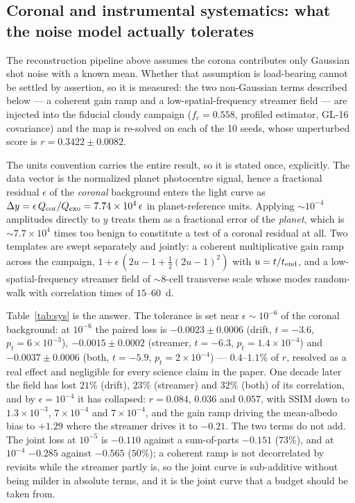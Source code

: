 \documentclass[twocolumn,10pt]{article}
\begin{document}
\subsection{Coronal and instrumental systematics: what the noise model
actually tolerates}
\label{sec:sys}
The reconstruction pipeline above assumes the corona contributes only Gaussian
shot noise with a known mean. Whether that assumption is
load-bearing cannot be settled by assertion, so it is measured: the two
non-Gaussian terms described below --- a coherent gain ramp and a
low-spatial-frequency streamer field --- are injected into the fiducial cloudy
campaign ($f_c=0.558$, profiled estimator, GL-16 covariance) and the map is
re-solved on each of the 10 seeds, whose unperturbed score is
$r=0.3422\pm0.0082$.

The units convention carries the entire result, so it is stated once, explicitly.
The data vector is the normalized planet photocentre signal, hence a fractional
residual $\epsilon$ of the \emph{coronal} background enters the light curve as
$\Delta y = \epsilon\,Q_{\rm cor}/Q_{\rm exo} = 7.74\times10^{4}\,\epsilon$ in
planet-reference units. Applying $\sim10^{-4}$ amplitudes directly to $y$ treats them as
a fractional error of the \emph{planet}, which is
$\sim7.7\times10^{4}$ times too benign to constitute a test of a coronal
residual at all. Two templates are swept separately and jointly: a coherent
multiplicative gain ramp across the campaign,
$1+\epsilon\,(2u-1+\tfrac{1}{2}(2u-1)^{2})$ with $u=t/t_{\rm end}$, and a
low-spatial-frequency streamer field of $\sim$8-cell transverse scale whose
modes random-walk with correlation times of $15$--$60$~d.

Table~\ref{tab:sys} is the answer. The tolerance is set near
$\epsilon\sim10^{-6}$ of the coronal background: at $10^{-6}$ the paired loss is
$-0.0023\pm0.0006$ (drift, $t=-3.6$, $p_t=6\times10^{-3}$),
$-0.0015\pm0.0002$ (streamer, $t=-6.3$, $p_t=1.4\times10^{-4}$) and
$-0.0037\pm0.0006$ (both, $t=-5.9$, $p_t=2\times10^{-4}$) --- $0.4$--$1.1\%$ of $r$,
resolved as a real effect and negligible for every science claim in the paper.
One decade later the field has lost $21\%$ (drift), $23\%$ (streamer) and $32\%$
(both) of its correlation, and by $\epsilon=10^{-4}$ it has collapsed:
$r=0.084$, $0.036$ and $0.057$, with SSIM down to
$1.3\times10^{-3}$, $7\times10^{-4}$ and $7\times10^{-4}$, and the gain ramp
driving the mean-albedo bias to $+1.29$ where the streamer drives it to $-0.21$.
The two terms do not add. The joint loss at $10^{-5}$ is $-0.110$ against a
sum-of-parts $-0.151$ ($73\%$), and at $10^{-4}$ $-0.285$ against $-0.565$
($50\%$); a coherent ramp is not decorrelated by revisits while the streamer
partly is, so the joint curve is sub-additive without being milder in absolute
terms, and it is the joint curve that a budget should be taken from.
\end{document}
